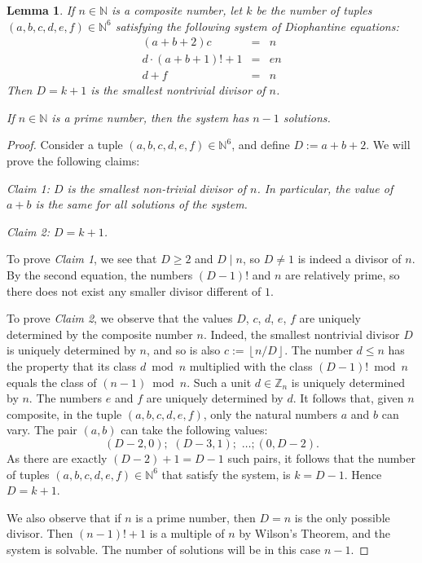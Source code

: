 \documentclass[10pt]{article}
\theoremstyle{plain}
\newtheorem{lemma}{Lemma}[section]
\newcommand{\floor}[1]{\left\lfloor #1 \right\rfloor}
\begin{document}
\begin{lemma}\label{lemmasmallestprimedivisor}
     If $n \in \mathbb N$ is a composite number, let $k$ be the number of tuples $(a, b, c, d, e, f) \in \mathbb N^6$ satisfying the following system of Diophantine equations:
    \begin{eqnarray*}
     (a+b+2) c &=& n \\
     d \cdot (a+b+1)! + 1 &=& en \\
     d + f &=& n
    \end{eqnarray*}
        Then $D = k+1$ is the smallest nontrivial divisor of $n$.

        If $n \in \mathbb N$ is a prime number, then the system has $n-1$ solutions.
\end{lemma}

\begin{proof}

 Consider a tuple $(a,b,c,d,e,f) \in \mathbb N^6$, and define $D:= a+b+2$. We will prove the following claims:

    {\it Claim 1: $D$ is the smallest non-trivial divisor of $n$. In particular, the value of $a+b$ is the same for all solutions of the system.}

    {\it Claim 2: $D = k+1$. }

    To prove {\it Claim 1}, we see that $D \geq 2$ and $D \mid n$, so $D \neq 1$ is indeed a divisor of $n$. By the second equation, the numbers $(D-1)!$ and $n$ are relatively prime, so there does not exist any smaller divisor different of $1$.

    To prove {\it Claim 2}, we observe that the values $D$, $c$, $d$, $e$, $f$ are uniquely determined by the composite number $n$. Indeed, the smallest nontrivial divisor $D$ is uniquely determined by $n$, and so is also $c := \floor{n/D}$. The number $d \leq n$ has the property that its class $d \bmod n$ multiplied with the class $(D-1)! \bmod n$ equals the class of $(n-1) \bmod n$. Such a unit $d \in \mathbb Z_n$ is uniquely determined by $n$. The numbers $e$ and $f$ are uniquely determined by $d$. It follows that, given $n$ composite, in the tuple $(a, b, c, d, e, f)$, only the natural numbers $a$ and $b$ can vary. The pair $(a,b)$ can take the following values:
    $$(D-2, 0); \,\,(D-3, 1); \,\, \dots; (0, D-2).$$
    As there are exactly $(D-2) + 1 = D-1$ such pairs, it follows that the number of tuples $(a, b, c, d, e, f) \in \mathbb N^6$ that satisfy the system, is $k = D-1$. Hence $D=k+1$.

    We also observe that if $n$ is a prime number, then $D = n$ is the only possible divisor. Then $(n-1)!+1$ is a multiple of $n$ by Wilson's Theorem, and the system is solvable. The number of solutions will be in this case $n-1$.
\end{proof}
\end{document}

